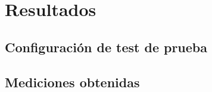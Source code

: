 \documentclass[\main/main.tex]{subfiles}
\begin{document}
\chapter{Resultados}
\label{cha:04_resultados}
	\section{Configuración de test de prueba}
	\label{sec:04_configuración_de_test_de_prueba}

	\section{Mediciones obtenidas}
	\label{sec:04_mediciones_obtenidas}
\end{document}
